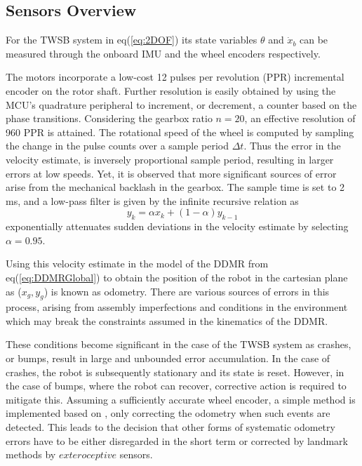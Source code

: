            \subsection{Sensors Overview}
        For the TWSB system in eq(\ref{eq:2DOF}) its state variables $\theta$ and $\dot x_b$ can be measured through the onboard IMU 
        and the wheel encoders respectively. 
                   
        The motors incorporate a low-cost 12 pulses per revolution (PPR) incremental encoder on the rotor shaft. 
        Further resolution is easily obtained by using the MCU's quadrature 
        peripheral to increment, or decrement, a counter based on the phase transitions.
        Considering the gearbox ratio $n=20$, an effective resolution of 960 PPR is attained.
        The rotational speed of the wheel is computed by sampling the change in the pulse counts
        over a sample period $\Delta t$. Thus the error in the velocity estimate, 
        is inversely proportional sample period, resulting in larger errors at low speeds.
        Yet, it is observed that more significant sources of error arise from the mechanical backlash in the gearbox.
        The sample time is set to 2 ms, and a low-pass filter is given by the infinite recursive relation as
        \begin{equation}
            y_k = \alpha x_k + (1-\alpha)y_{k-1}
            \label{eq:lpf}
        \end{equation}
        exponentially attenuates sudden deviations in the velocity estimate by selecting $\alpha = 0.95$.
       
        Using this velocity estimate in the model of the DDMR from eq(\ref{eq:DDMRGlobal}) to obtain the
        position of the robot in the cartesian plane as ($x_g,y_g$) is known as odometry.
        There are various sources of errors in 
        this process, arising from assembly imperfections and conditions in 
        the environment which may break the constraints assumed in the kinematics of the DDMR.
                   
        These conditions become significant in the case of the TWSB system as crashes, or bumps, result in large 
        and unbounded error accumulation. In the case of crashes, the robot is subsequently stationary 
        and its state is reset. However, in the case of bumps, where the robot can recover, corrective 
        action is required to mitigate this. Assuming a sufficiently accurate wheel encoder, a simple method is 
        implemented based on \cite{Gyrodometry}, only correcting 
        the odometry when such events are detected.  
        This leads to the decision that other forms of systematic odometry errors have to be 
        either disregarded in the short term or corrected by landmark methods by $exteroceptive$ sensors. 
       
